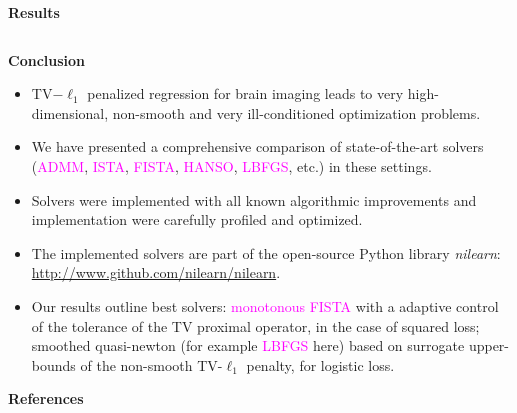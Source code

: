 \documentclass[french]{STIC_poster}
\begin{document}
\begin{frame}[t]
\begin{columns}[t]
\begin{column}{.48\linewidth}
\begin{abox}{\textbf{Results}}
			  \end{abox}
			\end{column}
			\hfill
		\end{columns}

                
\begin{abox}{\textbf{Conclusion}}
\begin{itemize}
\item TV$-\ell_{1}$ penalized regression for brain imaging leads to
very high-dimensional, non-smooth and very ill-conditioned optimization
problems.
\item We have presented a comprehensive comparison of state-of-the-art
solvers (\textcolor{magenta}{ADMM}, \textcolor{magenta}{ISTA}, \textcolor{magenta}{FISTA}, \textcolor{magenta}{HANSO}, \textcolor{magenta}{LBFGS}, etc.) in these settings.
\item Solvers were implemented with all known
algorithmic improvements and implementation were carefully profiled and
optimized.
\item The implemented solvers are part of the open-source Python library \textit{nilearn}: \url{http://www.github.com/nilearn/nilearn}.
\item Our results outline best solvers: \textcolor{magenta}{monotonous FISTA} with
a adaptive control of the tolerance of the TV proximal operator, in the case of squared loss; smoothed quasi-newton (for example \textcolor{magenta}{LBFGS} here) based on surrogate upper-bounds of the non-smooth TV-$\ell_{1}$ penalty, for
logistic loss.
\end{itemize}
\end{abox}


\begin{abox}[\textwidth]{\textbf{References}}

\end{abox}

\end{frame}
\end{document}
